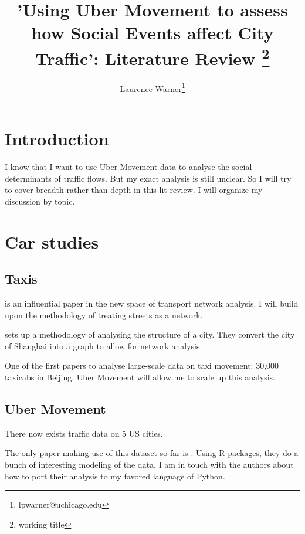 \documentclass[11pt, oneside]{article}
\begin{document}
\begin{titlepage}
\title{'Using Uber Movement to assess how Social Events affect City Traffic': Literature Review \thanks{working title}}

\author{Laurence Warner\thanks{lpwarner@uchicago.edu}}
\date{}
\maketitle

\end{titlepage}

\begin{spacing}{2}
\section{Introduction}

I know that I want to use Uber Movement data to analyse the social determinants of traffic flows. But my exact analysis is still unclear. So I will try to cover breadth rather than depth in this lit review. I will organize my discussion by topic.

\section{Car studies}

\subsection{Taxis}

\autocite{turner2007axial} is an influential paper in the new space of transport network analysis. I will build upon the methodology of treating streets as a network.

\autocite{liu2015revealing} sets up a methodology of analysing the structure of a city. They convert the city of Shanghai into a graph to allow for network analysis.

\autocite{zheng2011urban} One of the first papers to analyse large-scale data on taxi movement: 30,000 taxicabs in Beijing. Uber Movement will allow me to scale up this analysis. 

\subsection{Uber Movement}

There now exists traffic data on 5 US cities. 

The only paper making use of this dataset so far is \autocite{pearson11traffic}. Using R packages, they do a bunch of interesting modeling of the data. I am in touch with the authors about how to port their analysis to my favored language of Python. 


\end{spacing}
\end{document}
